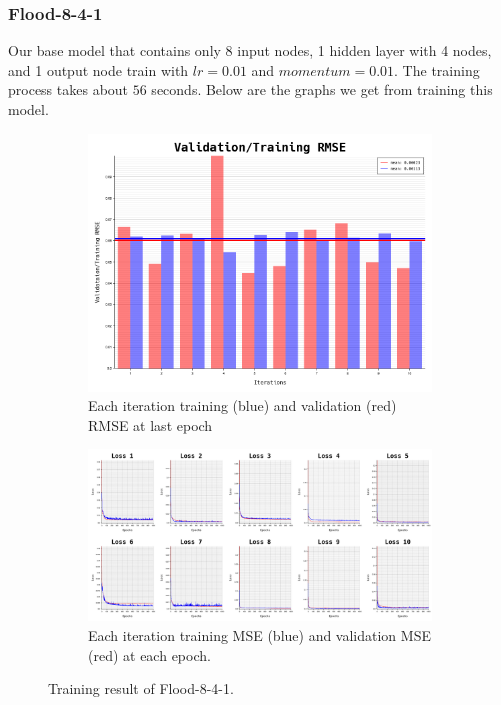 \documentclass{article}
\begin{document}
\subsubsection*{Flood-8-4-1}
Our base model that contains only 8 input nodes, 1 hidden layer with 4 nodes, and 1 output node train with $lr = 0.01$ and $momentum = 0.01$.
The training process takes about $56$ seconds. Below are the graphs we get from training this model. 
\begin{figure}[ht]
	\begin{subfigure}{\textwidth}
		\centering
		\includegraphics[scale=0.3]{flood-8-4-1/cv_l}
		\caption{Each iteration training (blue) and validation (red) RMSE at last epoch}
		\label{fig:2a}
	\end{subfigure}
	\begin{subfigure}{\textwidth}
		\includegraphics[width=\textwidth]{flood-8-4-1/loss}
		\caption{Each iteration training MSE (blue) and validation MSE (red) at each epoch.}
		\label{fig:2b}
	\end{subfigure}
	\caption{Training result of Flood-8-4-1.}
	\label{fig:2}
\end{figure}
\FloatBarrier
\end{document}
